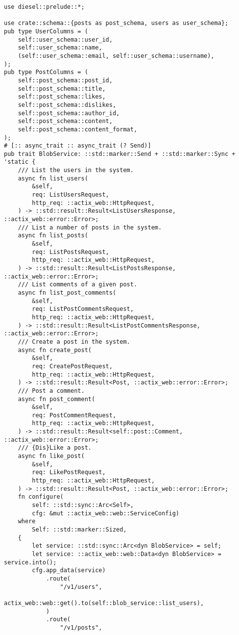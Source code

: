 \begin{verbatim}
use diesel::prelude::*;

use crate::schema::{posts as post_schema, users as user_schema};
pub type UserColumns = (
    self::user_schema::user_id,
    self::user_schema::name,
    (self::user_schema::email, self::user_schema::username),
);
pub type PostColumns = (
    self::post_schema::post_id,
    self::post_schema::title,
    self::post_schema::likes,
    self::post_schema::dislikes,
    self::post_schema::author_id,
    self::post_schema::content,
    self::post_schema::content_format,
);
# [:: async_trait :: async_trait (? Send)]
pub trait BlobService: ::std::marker::Send + ::std::marker::Sync + 'static {
    /// List the users in the system.
    async fn list_users(
        &self,
        req: ListUsersRequest,
        http_req: ::actix_web::HttpRequest,
    ) -> ::std::result::Result<ListUsersResponse, ::actix_web::error::Error>;
    /// List a number of posts in the system.
    async fn list_posts(
        &self,
        req: ListPostsRequest,
        http_req: ::actix_web::HttpRequest,
    ) -> ::std::result::Result<ListPostsResponse, ::actix_web::error::Error>;
    /// List comments of a given post.
    async fn list_post_comments(
        &self,
        req: ListPostCommentsRequest,
        http_req: ::actix_web::HttpRequest,
    ) -> ::std::result::Result<ListPostCommentsResponse, ::actix_web::error::Error>;
    /// Create a post in the system.
    async fn create_post(
        &self,
        req: CreatePostRequest,
        http_req: ::actix_web::HttpRequest,
    ) -> ::std::result::Result<Post, ::actix_web::error::Error>;
    /// Post a comment.
    async fn post_comment(
        &self,
        req: PostCommentRequest,
        http_req: ::actix_web::HttpRequest,
    ) -> ::std::result::Result<self::post::Comment, ::actix_web::error::Error>;
    /// {Dis}Like a post.
    async fn like_post(
        &self,
        req: LikePostRequest,
        http_req: ::actix_web::HttpRequest,
    ) -> ::std::result::Result<Post, ::actix_web::error::Error>;
    fn configure(
        self: ::std::sync::Arc<Self>,
        cfg: &mut ::actix_web::web::ServiceConfig)
    where
        Self: ::std::marker::Sized,
    {
        let service: ::std::sync::Arc<dyn BlobService> = self;
        let service: ::actix_web::web::Data<dyn BlobService> = service.into();
        cfg.app_data(service)
            .route(
                "/v1/users",
                actix_web::web::get().to(self::blob_service::list_users),
            )
            .route(
                "/v1/posts",

\end{verbatim}
